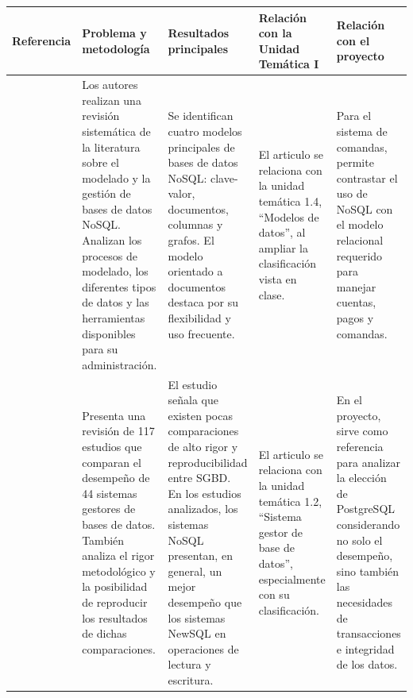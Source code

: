 \begin{table}[H]
    \centering
    \footnotesize
    \begin{tabularx}{\textwidth}
        {
            >{\RaggedRight\arraybackslash}p{2.4cm}
            >{\RaggedRight\arraybackslash}X 
            >{\RaggedRight\arraybackslash}X
            >{\RaggedRight\arraybackslash}X
            >{\RaggedRight\arraybackslash}X
        }
        
        \toprule

        \textbf{Referencia} & \textbf{Problema y metodología} & \textbf{Resultados principales} & \textbf{Relación con la Unidad Temática I} & \textbf{Relación con el proyecto} \\ 
        
        \midrule

        \textcite{aguilar2023} &
        Los autores realizan una revisión sistemática de la literatura sobre el modelado y la gestión de bases de datos NoSQL. Analizan los procesos de modelado, los diferentes tipos de datos y las herramientas disponibles para su administración. & 
        Se identifican cuatro modelos principales de bases de datos NoSQL: clave-valor, documentos, columnas y grafos. El modelo orientado a documentos destaca por su flexibilidad y uso frecuente. & 
        El articulo se relaciona con la unidad temática 1.4, \enquote{Modelos de datos}, al ampliar la clasificación vista en clase. & 
        Para el sistema de comandas, permite contrastar el uso de NoSQL con el modelo relacional requerido para manejar cuentas, pagos y comandas. \\ 

        \midrule

        \textcite{taipalus2024} &
        Presenta una revisión de 117 estudios que comparan el desempeño de 44 sistemas gestores de bases de datos. También analiza el rigor metodológico y la posibilidad de reproducir los resultados de dichas comparaciones. & 
        El estudio señala que existen pocas comparaciones de alto rigor y reproducibilidad entre SGBD. En los estudios analizados, los sistemas NoSQL presentan, en general, un mejor desempeño que los sistemas NewSQL en operaciones de lectura y escritura. & 
        El articulo se relaciona con la unidad temática 1.2, \enquote{Sistema gestor de base de datos}, especialmente con su clasificación. & 
        En el proyecto, sirve como referencia para analizar la elección de PostgreSQL considerando no solo el desempeño, sino también las necesidades de transacciones e integridad de los datos. \\
        

\end{tabularx}
\end{table}
